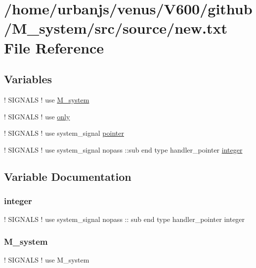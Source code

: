 \hypertarget{new_8txt}{}\section{/home/urbanjs/venus/\+V600/github/\+M\+\_\+system/src/source/new.txt File Reference}
\label{new_8txt}
\subsection*{Variables}
\begin{DoxyCompactItemize}
\item 
! S\+I\+G\+N\+A\+LS ! use \mbox{\hyperlink{new_8txt_a08ac2f3e0c522c27949c7c43cde06d0b}{M\+\_\+system}}
\item 
! S\+I\+G\+N\+A\+LS ! use \mbox{\hyperlink{new_8txt_a71e978da25ecbfe53bd64adc84698ae2}{only}}
\item 
! S\+I\+G\+N\+A\+LS ! use system\+\_\+signal \mbox{\hyperlink{new_8txt_a383abebb795558d146c68d571fb67ee9}{pointer}}
\item 
! S\+I\+G\+N\+A\+LS ! use system\+\_\+signal nopass \+::sub end type handler\+\_\+pointer \mbox{\hyperlink{new_8txt_a9ee7cdd594869e5d220b027e63ef451e}{integer}}
\end{DoxyCompactItemize}


\subsection{Variable Documentation}
\mbox{\label{new_8txt_a9ee7cdd594869e5d220b027e63ef451e}} 
\subsubsection{\texorpdfstring{integer}{integer}}
{\footnotesize\ttfamily ! S\+I\+G\+N\+A\+LS ! use system\+\_\+signal nopass \+:: sub end type handler\+\_\+pointer integer}

\mbox{\label{new_8txt_a08ac2f3e0c522c27949c7c43cde06d0b}} 
\subsubsection{\texorpdfstring{M\+\_\+system}{M\_system}}
{\footnotesize\ttfamily ! S\+I\+G\+N\+A\+LS ! use M\+\_\+system}

